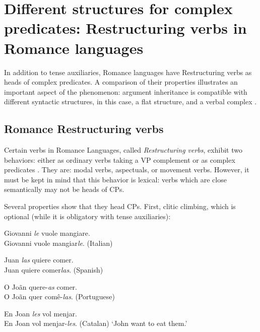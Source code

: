\documentclass[output=paper]{langsci/langscibook}
\begin{document}
\section{Different structures for complex predicates: Restructuring verbs in Romance languages }

In addition to tense auxiliaries, Romance languages have Restructuring verbs as heads of complex predicates. A comparison of their properties illustrates an important aspect of the phenomenon: argument inheritance is compatible with different syntactic structures, in this case, a flat structure, and a verbal complex \citep{AG2010}. 



\subsection{Romance Restructuring verbs}

Certain verbs in Romance Languages, called \textit{Restructuring verbs}, exhibit two behaviors: either as ordinary verbs taking a VP complement or as complex predicates \citep{AP1983, Rizzi1982}. They are: modal verbs, aspectuals, or movement verbs. However, it must be kept in mind that this behavior is lexical: verbs which are close semantically may not be heads of CPs. 

Several properties show that they head CPs. First, clitic climbing, which is optional (while it is
obligatory with tense auxiliaries):


\begin{exe}
	\ex  \label{romance}
	
	\begin{xlist}
		\ex Giovanni \textit{le} vuole mangiare. \\
         	Giovanni vuole mangiar\textit{le}. (Italian)
    		
		\ex Juan \textit{las} quiere comer. \\
		Juan quiere comer\textit{las}. (Spanish)
		
		\ex O Jo\~{a}n quere-\textit{as} comer. \\
		O Jo\~{a}n quer com\^e-\textit{las}.   (Portuguese)
		
		\ex En Joan \textit{les} vol menjar. \\
		 En Joan vol menjar-\textit{les}.        (Catalan)
		\glt `John want to eat them.' \citep{AG2010}
		
		
	\end{xlist}
	
\end{exe}
\end{document}
